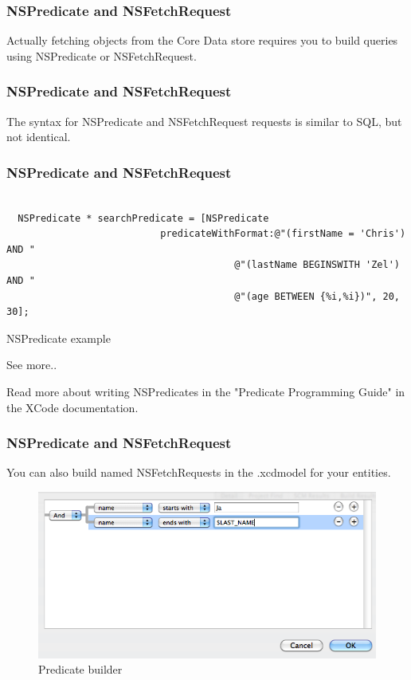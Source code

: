 \documentclass[10pt]{beamer}
\begin{document}
    
\begin{frame}[fragile]
  \frametitle{NSPredicate and NSFetchRequest}
  Actually fetching objects from the Core Data store requires you to build queries using NSPredicate or NSFetchRequest.

\end{frame}

\begin{frame}[fragile]
  \frametitle{NSPredicate and NSFetchRequest}
  The syntax for NSPredicate and NSFetchRequest requests is similar to SQL, but not identical.

\end{frame}

\begin{frame}[fragile]
  \frametitle{NSPredicate and NSFetchRequest}
  \begin{listing}[H]
    \begin{verbatim}

  NSPredicate * searchPredicate = [NSPredicate
                           predicateWithFormat:@"(firstName = 'Chris') AND "
                                        @"(lastName BEGINSWITH 'Zel') AND "
                                        @"(age BETWEEN {%i,%i})", 20, 30];

  \end{verbatim}
    \caption{NSPredicate example}
    \label{listing:41}
  \end{listing}
\begin{block}{See more..}

  Read more about writing NSPredicates in the "Predicate Programming Guide" in
  the XCode documentation.

  \end{block}

\end{frame}

\begin{frame}[fragile]
  \frametitle{NSPredicate and NSFetchRequest}
  You can also build named NSFetchRequests in the .xcdmodel for your entities. \begin{figure}[htb]
  \begin{center}

  \includegraphics[scale=0.5]{PredicateBuilder.png}

  \caption{Predicate builder}
  \end{center}
  \end{figure}

\end{frame}
\end{document}
